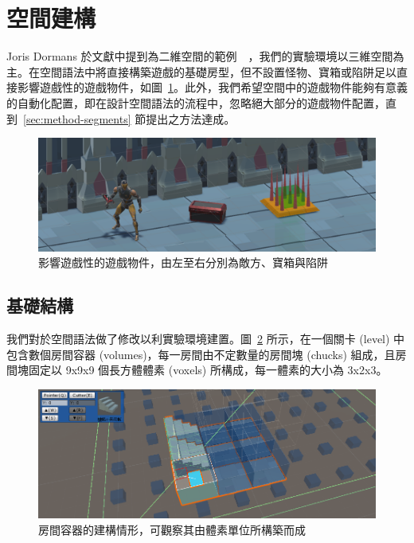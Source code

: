 \clearpage

\section{空間建構}
\label{sec:method-spacepieces}

Joris Dormans 於文獻中提到為二維空間的範例~\cite{dormans2010adventures}~\cite{dormans2012engineering}，我們的實驗環境以三維空間為主。在空間語法中將直接構築遊戲的基礎房型，但不設置怪物、寶箱或陷阱足以直接影響遊戲性的遊戲物件，如圖~\ref{fig:gameobject-list}。此外，我們希望空間中的遊戲物件能夠有意義的自動化配置，即在設計空間語法的流程中，忽略絕大部分的遊戲物件配置，直到~\ref{sec:method-segments} 節提出之方法達成。

\begin{figure}[ht]
  \begin{center}
    \includegraphics[width=1.0\textwidth]{figures/gameobject-list.png}
    \caption{影響遊戲性的遊戲物件，由左至右分別為敵方、寶箱與陷阱} 
    \label{fig:gameobject-list}
  \end{center}
\end{figure}

\subsection{基礎結構}
\label{ssec:method-spacepieces-basic}

我們對於空間語法做了修改以利實驗環境建置。圖~\ref{fig:spacepieces-structure} 所示，在一個關卡 (level) 中包含數個房間容器 (volumes)，每一房間由不定數量的房間塊 (chucks) 組成，且房間塊固定以 9x9x9 個長方體體素 (voxels) 所構成，每一體素的大小為 3x2x3。

\begin{figure}[ht]
  \begin{center}
    \includegraphics[width=1.0\textwidth]{figures/spacepieces-structure.png}
    \caption{房間容器的建構情形，可觀察其由體素單位所構築而成} 
    \label{fig:spacepieces-structure}
  \end{center}
\end{figure}

